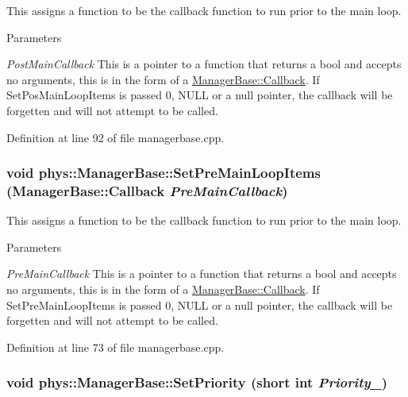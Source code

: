 This assigns a function to be the callback function to run prior to the main loop. 


\begin{DoxyParams}{Parameters}
\item[{\em PostMainCallback}]This is a pointer to a function that returns a bool and accepts no arguments, this is in the form of a \hyperlink{classphys_1_1ManagerBase_a753f5f0127131529767beab2502f480b}{ManagerBase::Callback}. If SetPosMainLoopItems is passed 0, NULL or a null pointer, the callback will be forgetten and will not attempt to be called. \end{DoxyParams}


Definition at line 92 of file managerbase.cpp.

\hypertarget{classphys_1_1ManagerBase_a3fcf207a451d0047f884babadd0bc53e}{
\subsubsection[{SetPreMainLoopItems}]{\setlength{\rightskip}{0pt plus 5cm}void phys::ManagerBase::SetPreMainLoopItems ({\bf ManagerBase::Callback} {\em PreMainCallback})}}
\label{d2/de3/classphys_1_1ManagerBase_a3fcf207a451d0047f884babadd0bc53e}


This assigns a function to be the callback function to run prior to the main loop. 


\begin{DoxyParams}{Parameters}
\item[{\em PreMainCallback}]This is a pointer to a function that returns a bool and accepts no arguments, this is in the form of a \hyperlink{classphys_1_1ManagerBase_a753f5f0127131529767beab2502f480b}{ManagerBase::Callback}. If SetPreMainLoopItems is passed 0, NULL or a null pointer, the callback will be forgetten and will not attempt to be called. \end{DoxyParams}


Definition at line 73 of file managerbase.cpp.

\hypertarget{classphys_1_1ManagerBase_a6e30dc5f2a9c64f95efb2ef4428b0f98}{
\subsubsection[{SetPriority}]{\setlength{\rightskip}{0pt plus 5cm}void phys::ManagerBase::SetPriority (short int {\em Priority\_\-})}}
\label{d2/de3/classphys_1_1ManagerBase_a6e30dc5f2a9c64f95efb2ef4428b0f98}


